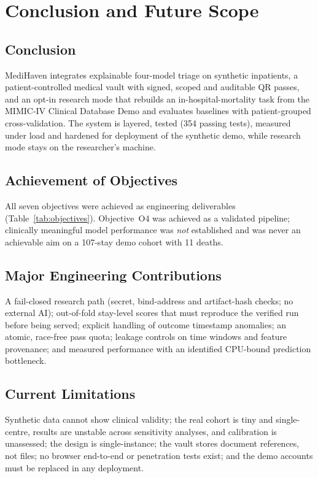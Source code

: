 \chapter{Conclusion and Future Scope}
\label{ch:concl}

\section{Conclusion}
MediHaven integrates explainable four-model triage on synthetic inpatients, a patient-controlled medical
vault with signed, scoped and auditable QR passes, and an opt-in research mode that rebuilds an
in-hospital-mortality task from the MIMIC-IV Clinical Database Demo and evaluates baselines with
patient-grouped cross-validation. The system is layered, tested (354 passing tests), measured under load
and hardened for deployment of the synthetic demo, while research mode stays on the researcher's machine.

\section{Achievement of Objectives}
All seven objectives were achieved as engineering deliverables (Table~\ref{tab:objectives}). Objective~O4
was achieved as a validated pipeline; clinically meaningful model performance was \emph{not} established and
was never an achievable aim on a 107-stay demo cohort with 11 deaths.

\section{Major Engineering Contributions}
A fail-closed research path (secret, bind-address and artifact-hash checks; no external AI); out-of-fold
stay-level scores that must reproduce the verified run before being served; explicit handling of outcome
timestamp anomalies; an atomic, race-free pass quota; leakage controls on time windows and feature
provenance; and measured performance with an identified CPU-bound prediction bottleneck.

\section{Current Limitations}
Synthetic data cannot show clinical validity; the real cohort is tiny and single-centre, results are
unstable across sensitivity analyses, and calibration is unassessed; the design is single-instance;
the vault stores document references, not files; no browser end-to-end or penetration tests exist; and
the demo accounts must be replaced in any deployment.

